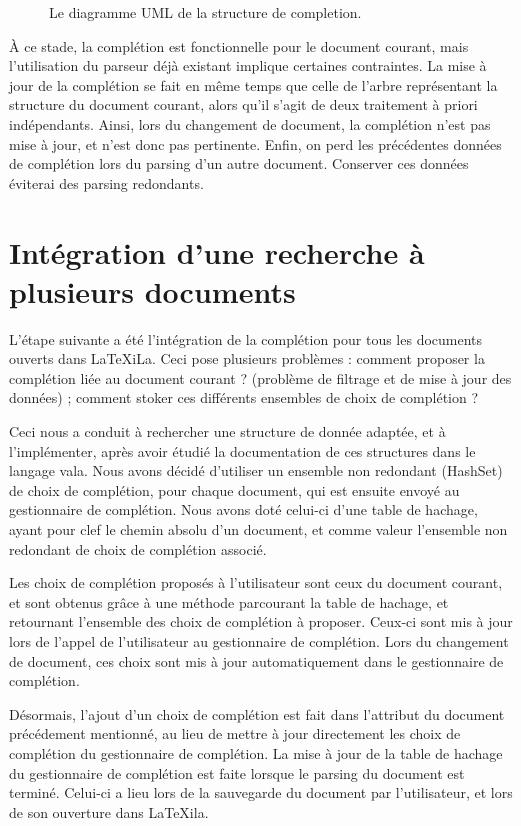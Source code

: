 \documentclass[a4paper,11pt]{report}
\begin{document}
\begin{figure}[h!]
\label{fig:uml_completion_structure}
\centering

\caption{Le diagramme UML de la structure de completion.}
\end{figure}

À ce stade, la complétion est fonctionnelle pour le document courant, mais l'utilisation du parseur déjà existant implique certaines contraintes. La mise à jour de la complétion se fait en même temps que celle de l'arbre représentant la structure du document courant, alors qu'il s'agit de deux traitement à priori indépendants. Ainsi, lors du changement de document, la complétion n'est pas mise à jour, et n'est donc pas pertinente. Enfin, on perd les précédentes données de complétion lors du parsing d'un autre document. Conserver ces données éviterai des parsing redondants.

\section{Intégration d'une recherche à plusieurs documents}

L'étape suivante a été l'intégration de la complétion pour tous les documents ouverts dans LaTeXiLa. Ceci pose plusieurs problèmes : comment proposer la complétion liée au document courant ? (problème de filtrage et de mise à jour des données) ; comment stoker ces différents ensembles de choix de complétion ?

Ceci nous a conduit à rechercher une structure de donnée adaptée, et à l'implémenter, après avoir étudié la documentation de ces structures dans le langage vala. Nous avons décidé d'utiliser un ensemble non redondant (HashSet) de choix de complétion, pour chaque document, qui est ensuite envoyé au gestionnaire de complétion. Nous avons doté celui-ci d'une table de hachage, ayant pour clef le chemin absolu d'un document, et comme valeur l'ensemble non redondant de choix de complétion associé. 

Les choix de complétion proposés à l'utilisateur sont ceux du document courant, et sont obtenus grâce à une méthode parcourant la table de hachage, et retournant l'ensemble des choix de complétion à proposer. Ceux-ci sont mis à jour lors de l'appel de l'utilisateur au gestionnaire de complétion. Lors du changement de document, ces choix sont mis à jour automatiquement dans le gestionnaire de complétion.

Désormais, l'ajout d'un choix de complétion est fait dans l'attribut du document précédement mentionné, au lieu de mettre à jour directement les choix de complétion du gestionnaire de complétion. La mise à jour de la table de hachage du gestionnaire de complétion est faite lorsque le parsing du document est terminé. Celui-ci a lieu lors de la sauvegarde du document par l'utilisateur, et lors de son ouverture dans LaTeXila.
\end{document}
